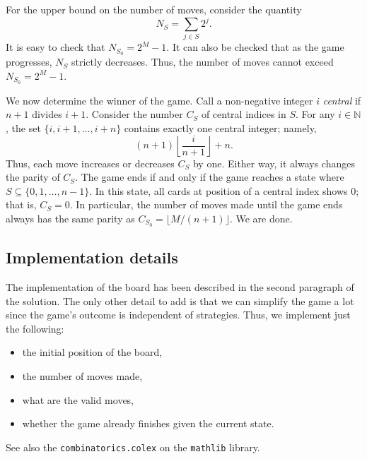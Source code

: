 \documentclass{article}
\newcommand{\N}{\mathbb{N}}
\begin{document}
For the upper bound on the number of moves, consider the quantity
\[ N_S = \sum_{j \in S} 2^j. \]
It is easy to check that $N_{S_0} = 2^M - 1$.
It can also be checked that as the game progresses, $N_S$ strictly decreases.
Thus, the number of moves cannot exceed $N_{S_0} = 2^M - 1$.

We now determine the winner of the game.
Call a non-negative integer $i$ \emph{central} if $n + 1$ divides $i + 1$.
Consider the number $C_S$ of central indices in $S$.
For any $i \in \N$, the set $\{i, i + 1, \ldots, i + n\}$ contains exactly one central integer; namely,
\[ (n + 1) \left\lfloor \frac{i}{n + 1} \right\rfloor + n. \]
Thus, each move increases or decreases $C_S$ by one.
Either way, it always changes the parity of $C_S$.
The game ends if and only if the game reaches a state where $S \subseteq \{0, 1, \ldots, n - 1\}$.
In this state, all cards at position of a central index shows $0$; that is, $C_S = 0$.
In particular, the number of moves made until the game ends always has the same parity as $C_{S_0} = \lfloor M/(n + 1) \rfloor$.
We are done.



\subsection*{Implementation details}

The implementation of the board has been described in the second paragraph of the solution.
The only other detail to add is that we can simplify the game a lot since the game's outcome is independent of strategies.
Thus, we implement just the following:
\begin{itemize}
    \item   the initial position of the board,
    \item   the number of moves made,
    \item   what are the valid moves,
    \item   whether the game already finishes given the current state.
\end{itemize}

See also the \texttt{combinatorics.colex} on the \texttt{mathlib} library.
\end{document}
